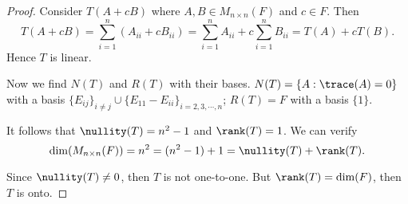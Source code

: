\begin{Exercise}
	\begin{proof}
		Consider $T(A+c B)$ where $A,B\in M_{n\times n}(F)$ and $c\in F$.
		Then
		$$
		T(A+c B) = \sum_{i=1}^{n} \left( A_{i i}+c B_{i i} \right)
		= \sum_{i=1}^{n} A_{i i} + c\sum_{i=1}^{n} B_{i i}
		= T(A) + c T(B).
		$$
		Hence $T$ is linear.
		
		Now we find $N(T)$ and $R(T)$ with their bases. $N(T) = \{ A:\trace(A) = 0\}$ with a basis $\{E_{i j}\}_{i\neq j}\cup \{E_{1 1} - E_{i i} \}_{i=2,3,\cdots,n}$;
		$R(T) = F$ with a basis $\{1\}$.
		
		It follows that $\nullity(T) = n^2-1$ and $\rank(T) = 1$. We can verify
		$$
		\dim(M_{n\times n}(F)) = n^2 = (n^2-1) + 1 =  \nullity(T)+\rank(T).
		$$
		
		Since $\nullity(T)\neq 0$, then $T$ is not one-to-one. But $\rank(T) = \dim(F)$, then $T$ is onto.
	\end{proof}
\end{Exercise}
